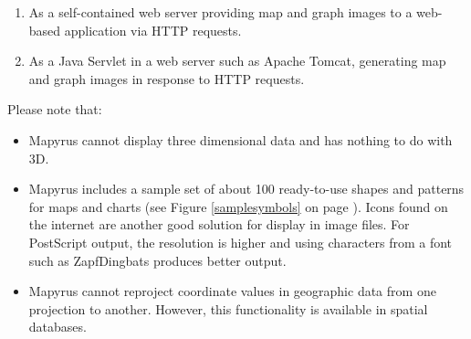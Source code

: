 \begin{enumerate}
\begin{enumerate}
\item
As a self-contained web server providing map and
graph images to a web-based application via HTTP requests.

\item
As a Java Servlet in a web server such as Apache Tomcat,
generating map and graph images in response to HTTP requests.

\end{enumerate}

\end{enumerate}


Please note that:

\begin{itemize}

\item
Mapyrus cannot display three dimensional data and has nothing to do
with 3D.

\item
Mapyrus includes a sample set of about 100 ready-to-use shapes and patterns
for maps and charts (see Figure \ref{samplesymbols}
on page \pageref{samplesymbols}).
Icons found on the
internet are another good solution for display in image files.
For PostScript output, the resolution is higher and using characters
from a font such as ZapfDingbats produces better output.

\item
Mapyrus cannot reproject coordinate values in geographic data from
one projection to another.  However, this functionality
is available in spatial databases.
\end{itemize}

